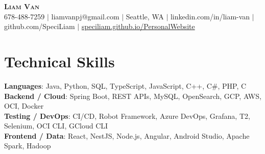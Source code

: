 \documentclass[letterpaper,11pt]{article}
\begin{document}

%
\begin{center}
    \textbf{\Huge \scshape Liam Van} \\ \vspace{1pt}
    \small 678-488-7259 $|$ \small {liamvanpj@gmail.com} $|$ Seattle, WA
 {{$|$ linkedin.com/in/liam-van} {$|$ github.com/SpeciLiam} {$|$ \href{https://speciliam.github.io/PersonalWebsite}{speciliam.github.io/PersonalWebsite}}}

\end{center}

\section{Technical Skills}
 \begin{itemize}[leftmargin=0.15in, label={}]
    \small{\item{
     \textbf{Languages}{: Java, Python, SQL, TypeScript, JavaScript, C++, C\#, PHP, C} \\
     \textbf{Backend / Cloud}{: Spring Boot, REST APIs, MySQL, OpenSearch, GCP, AWS, OCI, Docker} \\
     \textbf{Testing / DevOps}{: CI/CD, Robot Framework, Azure DevOps, Grafana, T2, Selenium, OCI CLI, GCloud CLI} \\
     \textbf{Frontend / Data}{: React, NestJS, Node.js, Angular, Android Studio, Apache Spark, Hadoop} \\
    }}
 \end{itemize}
%
\end{document}
